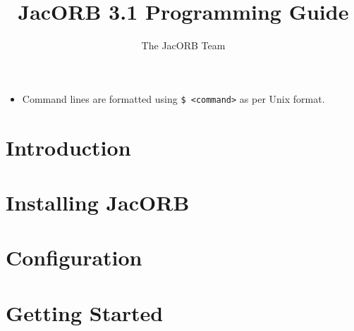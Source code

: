 \documentclass[12pt]{scrbook}
\title{JacORB 3.1 Programming Guide}
\author{The JacORB Team}
\begin{document}
\newcommand{\cmdline}[1]{\begin{small}\noindent \texttt{\$ #1}\end{small}}

\newcommand{\JacORBDir}{jacorb-3\_1}
\newcommand{\JacORBVersion}{3.1}
\maketitle

\setlength{\parskip}{1.1ex}
\newpage
\tableofcontents

\label{FormatStyle}
\begin{itemize}
\item Command lines are formatted using {\tt \$ <command>} as per Unix format.
\end{itemize}


\chapter{Introduction}
\label{ch:intro}




\chapter{Installing JacORB}
\label{ch:installing}




\chapter{Configuration}
\label{ch:configuration}




\chapter{Getting Started}
\label{ch:start}
\end{document}
